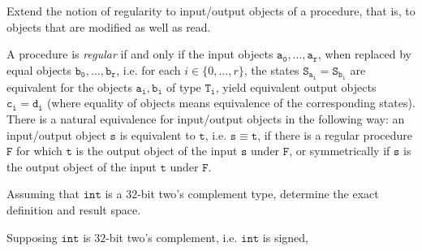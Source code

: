 \begin{Exercise}
    Extend the notion of regularity to input/output objects of a procedure, 
    that is, to objects that are modified as well as read.
\end{Exercise}

\begin{solution}
    A procedure is \textit{regular} if and only if the input objects 
    $\mathtt{a_{0}}, \dots ,\mathtt{a_{r}}$, when replaced by equal objects 
    $\mathtt{b_{0}}, \dots, \mathtt{b_{r}}$, i.e. for each $i \in 
    \{0, \dots, r \}$, the states $\mathtt{S_{a_{i}}} = \mathtt{S_{b_{i}}}$ are 
    equivalent for the objects $\mathtt{a_{i}}, \mathtt{b_{i}}$ of type 
    $\mathtt{T_i}$, yield equivalent output objects $\mathtt{c_{i}} = \mathtt{d_{i}}$ 
    (where equality of objects means equivalence of the corresponding 
    states). There is a natural equivalence for input/output objects 
    in the following way: an input/output object $\mathtt{s}$ is 
    equivalent to $\mathtt{t}$, i.e. $\mathtt{s} \equiv \mathtt{t}$, if 
    there is a regular procedure $\mathtt{F}$ for which $\mathtt{t}$ is 
    the output object of the input $\mathtt{s}$ under $\mathtt{F}$, or symmetrically 
    if $\mathtt{s}$ is the output object of the input $\mathtt{t}$ under $\mathtt{F}$.
\end{solution}

\begin{Exercise}
    Assuming that $\mathtt{int}$ is a $32$-bit two's complement type, determine 
    the exact definition and result space.
\end{Exercise}

\begin{solution}
    Supposing $\mathtt{int}$ is $32$-bit two's complement, i.e. $\mathtt{int}$ is 
    signed,
\end{solution}